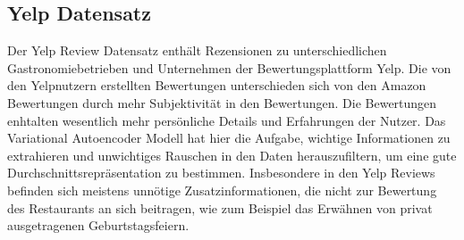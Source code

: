 



\subsection{Yelp Datensatz}
Der Yelp Review Datensatz \citep{meansum} enthält Rezensionen zu unterschiedlichen Gastronomiebetrieben und Unternehmen der Bewertungsplattform Yelp. 
Die von den Yelpnutzern erstellten Bewertungen unterschieden sich von den Amazon Bewertungen durch mehr Subjektivität in den Bewertungen.
Die Bewertungen enhtalten wesentlich mehr persönliche Details und Erfahrungen der Nutzer.
Das Variational Autoencoder Modell hat hier die Aufgabe, wichtige Informationen zu extrahieren und unwichtiges Rauschen in den Daten herauszufiltern, um eine gute Durchschnittsrepräsentation zu bestimmen.
Insbesondere in den Yelp Reviews befinden sich meistens unnötige Zusatzinformationen, die nicht zur Bewertung des Restaurants an sich beitragen, wie zum Beispiel das Erwähnen von privat ausgetragenen Geburtstagsfeiern. 

